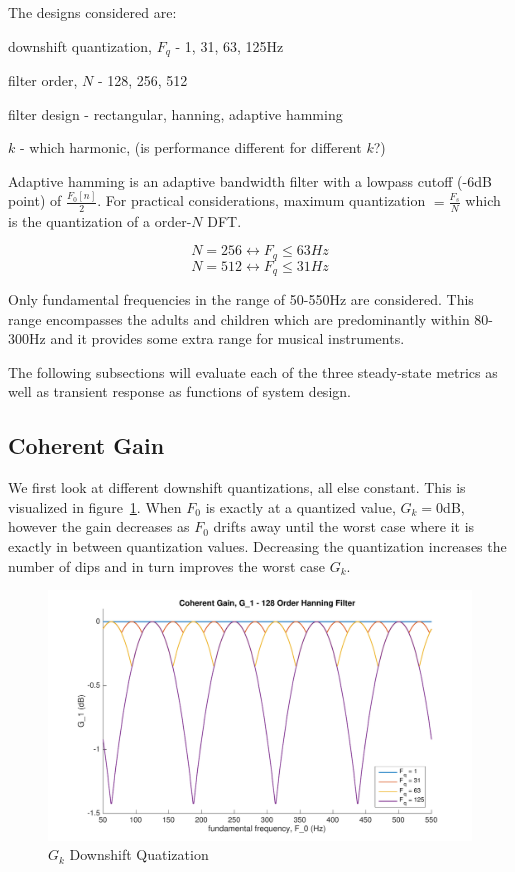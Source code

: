 \documentclass [11pt, proquest,oneside] {ganter_thesis}[2015/03/03]
\begin{document}
The designs considered are:


downshift quantization, $F_q$ - 1, 31, 63, 125Hz

filter order, $N$ - 128, 256, 512

filter design - rectangular, hanning, adaptive hamming

$k$ - which harmonic, (is performance different for different $k$?)

Adaptive hamming is an adaptive bandwidth filter with a lowpass cutoff (-6dB point) of $\frac{F_0[n]}{2}$.  For practical considerations, maximum quantization $= \frac{F_s}{N}$ which is the quantization of a order-$N$ DFT.

$$N = 256 \longleftrightarrow F_q \leq 63Hz$$
$$N = 512 \longleftrightarrow F_q \leq 31Hz$$

Only fundamental frequencies in the range of 50-550Hz are considered. This range encompasses the adults and children which are predominantly within 80-300Hz \cite{vandali2005pitch} and it provides some extra range for musical instruments.

The following subsections will evaluate each of the three steady-state metrics as well as transient response as functions of system design.

\subsection{Coherent Gain}

We first look at different downshift quantizations, all else constant.  This is visualized in figure~\ref{fig:g_k_1}.  When $F_0$ is exactly at a quantized value, $G_k = 0$dB, however the gain decreases as $F_0$ drifts away until the worst case where it is exactly in between quantization values.  Decreasing the quantization increases the number of dips and in turn improves the worst case $G_k$.

\begin{figure}[!ht]
  \centering
    \includegraphics[width=1\textwidth]{g_k_1}   
    \caption{$G_k$ Downshift Quatization}\label{fig:g_k_1}
\end{figure}
\end{document}

